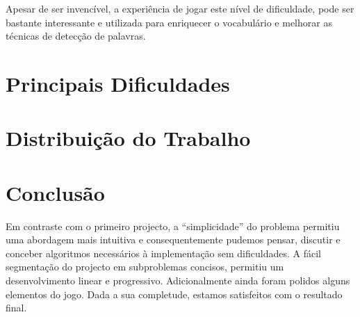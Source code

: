 \documentclass[12pt,a4paper,reqno]{report}
\numberwithin{equation}{section}
\begin{document}
Apesar de ser invencível, a experiência de jogar este nível de dificuldade, pode ser bastante interessante e utilizada para enriquecer o vocabulário e melhorar as técnicas de detecção de palavras.

\chapter{Principais Dificuldades}


\chapter{Distribuição do Trabalho}

\chapter{Conclusão}

Em contraste com o primeiro projecto, a ``simplicidade'' do problema permitiu uma abordagem mais intuitiva e consequentemente pudemos pensar, discutir e conceber algoritmos necessários à implementação sem dificuldades. A fácil segmentação do projecto em subproblemas concisos, permitiu um desenvolvimento linear e progressivo. Adicionalmente ainda foram polidos alguns elementos do jogo. Dada a sua completude, estamos satisfeitos com o resultado final.
\end{document}
